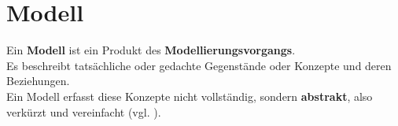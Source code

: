 \section{Modell}



\vspace{2mm}
\begin{tcolorbox}[title=Arbeitsdefinition ``Modell``]
    Ein \textbf{Modell} ist ein Produkt des \textbf{Modellierungsvorgangs}.\\

    \noindent
    Es beschreibt tatsächliche oder gedachte Gegenstände oder Konzepte und deren Beziehungen.\\

    \noindent
    Ein Modell erfasst diese Konzepte nicht vollständig, sondern \textbf{abstrakt}, also verkürzt und vereinfacht (vgl. \cite[2]{Wed09b}).
\end{tcolorbox}
\vspace{2mm}